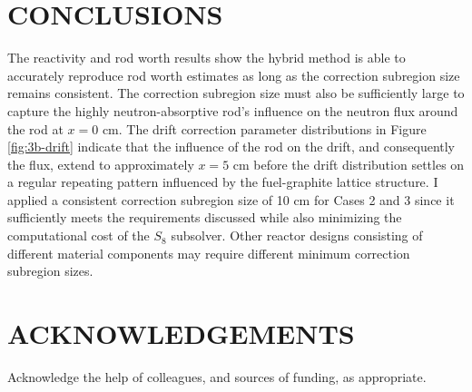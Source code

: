 \documentclass[letterpaper]{mc2025}
\begin{document}
\section{CONCLUSIONS}

The reactivity and rod worth results show the hybrid method is able to accurately
reproduce rod worth estimates as long as the correction subregion size remains consistent. The
correction subregion size must also be sufficiently large to capture the highly neutron-absorptive
rod's influence on the neutron flux around the rod at $x=0$ cm. The drift correction parameter
distributions in Figure \ref{fig:3b-drift} indicate that the influence of the rod on the drift, and
consequently the flux, extend to approximately $x=5$ cm before the drift distribution settles on a
regular repeating pattern influenced by the fuel-graphite lattice structure. I applied a consistent
correction subregion size of 10 cm for Cases 2 and 3 since it sufficiently meets the requirements
discussed while also minimizing the computational cost of the $S_8$ subsolver. Other reactor
designs consisting of different material components may require different minimum correction
subregion sizes.

\section*{ACKNOWLEDGEMENTS}
Acknowledge the help of colleagues, and sources of funding, as appropriate.



\end{document}
